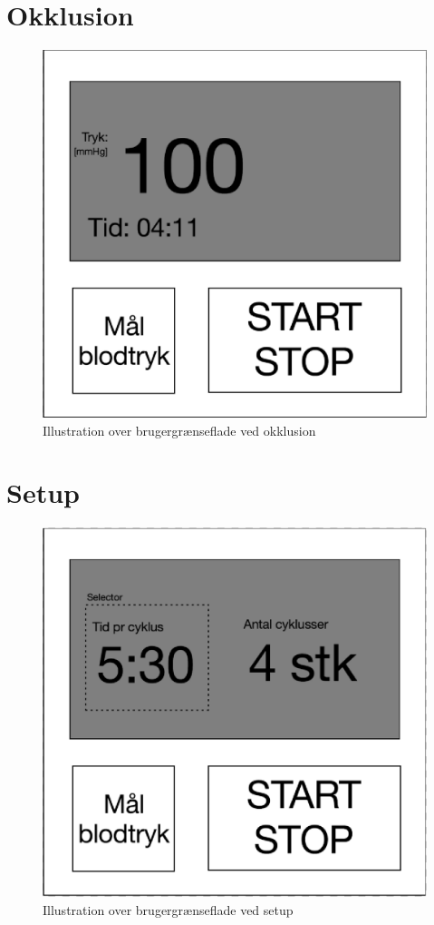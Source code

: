 \section{Okklusion}
\begin{figure}[H]
	\includegraphics[width=\textwidth]{Illustrationer/OkklusionGUI}	
	\caption{Illustration over brugergrænseflade ved okklusion}
\end{figure}


\section{Setup}
\begin{figure}[H]
	\includegraphics[width=\textwidth]{Illustrationer/SetupGUI}
	\caption{Illustration over brugergrænseflade ved setup}
\end{figure}


